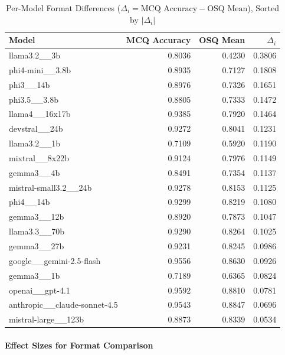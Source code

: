 \begin{table}[htbp]
\centering
\caption{Per-Model Format Differences ($\Delta_i = \text{MCQ Accuracy} - \text{OSQ Mean}$), Sorted by $|\Delta_i|$}
\label{tab:model_diff_mirror}
\begin{tabular}{lrrr}
\toprule
Model & MCQ Accuracy & OSQ Mean & $\Delta_i$ \\
\midrule
llama3.2\_\_3b                     & 0.8036 & 0.4230 & 0.3806 \\
phi4-mini\_\_3.8b                  & 0.8935 & 0.7127 & 0.1808 \\
phi3\_\_14b                        & 0.8976 & 0.7326 & 0.1651 \\
phi3.5\_\_3.8b                     & 0.8805 & 0.7333 & 0.1472 \\
llama4\_\_16x17b                   & 0.9385 & 0.7920 & 0.1464 \\
devstral\_\_24b                    & 0.9272 & 0.8041 & 0.1231 \\
llama3.2\_\_1b                     & 0.7109 & 0.5920 & 0.1190 \\
mixtral\_\_8x22b                   & 0.9124 & 0.7976 & 0.1149 \\
gemma3\_\_4b                       & 0.8491 & 0.7354 & 0.1137 \\
mistral-small3.2\_\_24b            & 0.9278 & 0.8153 & 0.1125 \\
phi4\_\_14b                        & 0.9299 & 0.8219 & 0.1080 \\
gemma3\_\_12b                      & 0.8920 & 0.7873 & 0.1047 \\
llama3.3\_\_70b                    & 0.9290 & 0.8264 & 0.1025 \\
gemma3\_\_27b                      & 0.9231 & 0.8245 & 0.0986 \\
google\_\_gemini-2.5-flash         & 0.9556 & 0.8630 & 0.0926 \\
gemma3\_\_1b                       & 0.7189 & 0.6365 & 0.0824 \\
openai\_\_gpt-4.1                  & 0.9592 & 0.8810 & 0.0781 \\
anthropic\_\_claude-sonnet-4.5     & 0.9543 & 0.8847 & 0.0696 \\
mistral-large\_\_123b              & 0.8873 & 0.8339 & 0.0534 \\
\bottomrule
\end{tabular}
\end{table}

\paragraph{Effect Sizes for Format Comparison}


